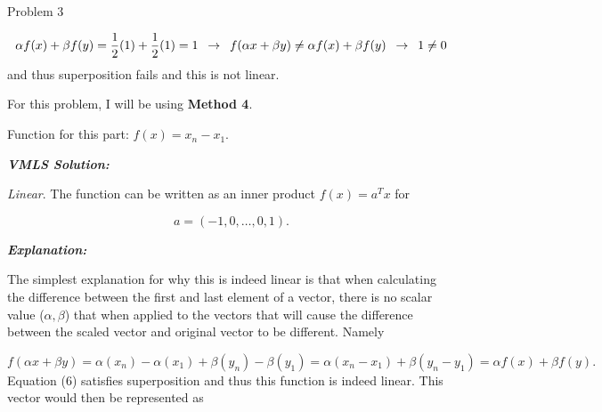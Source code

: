 \begin{problem}{Problem 3}
\begin{Highlight}
        \begin{equation}
            \alpha f(x) + \beta f(y) = \frac{1}{2}(1) + \frac{1}{2}(1) = 1 \hspace*{5pt} \rightarrow \hspace*{5pt} f(\alpha x + \beta y) \neq \alpha f(x) + \beta f(y) \hspace*{5pt} \rightarrow \hspace*{5pt} 1 \neq 0
        \end{equation}
        and thus superposition fails and this is not linear.
    \end{Highlight}

    \begin{Highlight}
        For this problem, I will be using \textbf{Method 4}. \vspace*{1em}

        Function for this part: $f(x) = x_{n} - x_{1}$. \vspace*{1em}

        \textbf{\textit{VMLS Solution:}} \vspace*{1em}

        \textit{Linear}. The function can be written as an inner product $f(x) = a^{T}x$ for 

        \begin{equation}
            a = (-1, 0, \dots , 0, 1).
        \end{equation}

        \textbf{\textit{Explanation:}} \vspace*{1em}

        The simplest explanation for why this is indeed linear is that when calculating the difference between the first and last element of a vector, there is no scalar value ($\alpha , \beta$) that when applied to the vectors
        that will cause the difference between the scaled vector and original vector to be different. Namely 

        \begin{equation}
            f(\alpha x + \beta y) = \alpha (x_{n}) - \alpha (x_{1}) + \beta (y_{n}) - \beta (y_{1}) = \alpha (x_{n} - x_{1}) + \beta (y_{n} - y_{1}) = \alpha f(x) + \beta f(y).
        \end{equation}
        Equation (6) satisfies superposition and thus this function is indeed linear. This vector would then be represented as 


\end{Highlight}
\end{problem}
